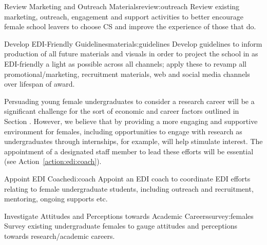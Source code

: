 \newcommand{\actreviewoutreach}{Review existing  marketing, outreach, engagement and support activities to better encourage female school leavers to choose CS and  improve the experience of those that  do.}
\begin{actionblock}{\ksspace{}Review Marketing and Outreach Materials}{review:outreach}
\actreviewoutreach 
\hfill{
    \hypersetup{hidelinks}
    \hyperlink{b0}{\gotoactionsymbol{}}
}
\end{actionblock}



\newcommand{\actmaterialsguidelines}{Develop guidelines to inform production of all future materials and visuals in order to project the school in as EDI-friendly a light as possible across  all channels; apply these to revamp all promotional/marketing, recruitment materials, web and social media channels over lifespan of award.}
\begin{actionblock}{\ksspace{}Develop EDI-Friendly Guidelines}{materials:guidelines}
\actmaterialsguidelines
\hfill{
    \hypersetup{hidelinks}
    \hyperlink{b0}{\gotoactionsymbol{}}
}
\end{actionblock}



Persuading young female undergraduates to consider a research career will be a significant challenge for the sort of economic and career factors outlined in Section . However, we believe that  by providing a more engaging and supportive environment for females, including opportunities to engage with research as undergraduates through internships, for example, will help stimulate interest. 
The appointment of a designated staff member to lead these efforts
will be essential (see Action~\ref{action:edi:coach}).


\newcommand{\actedicoach}{Appoint an EDI coach to coordinate EDI efforts relating to female undergraduate students, including outreach and recruitment, mentoring, ongoing supports etc.}
\begin{actionblock}{\ksspace{}Appoint EDI Coach}{edi:coach}
\actedicoach 
\hfill{
    \hypersetup{hidelinks}
    \hyperlink{b0}{\gotoactionsymbol{}}
}
\end{actionblock}



\newcommand{\actsurveyfemales}{Survey existing undergraduate females to gauge attitudes and perceptions towards 
research/academic careers.}
\begin{actionblock}{\ksspace{}Investigate Attitudes and Perceptions towards Academic Careers}{survey:females}
\actsurveyfemales
\hfill{
    \hypersetup{hidelinks}
    \hyperlink{b0}{\gotoactionsymbol{}}
}
\end{actionblock}


